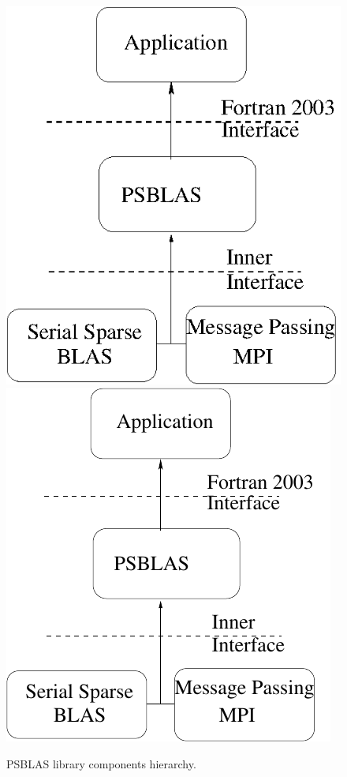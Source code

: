 \begin{figure}[h] 
\begin{center}
\ifcase\pdfoutput
\includegraphics[scale=0.65]{figures/psblas.eps}
\or
\includegraphics[scale=0.65]{figures/psblas}
\fi
\end{center}
\caption{PSBLAS library components hierarchy.\label{fig:psblas}}
\end{figure}


